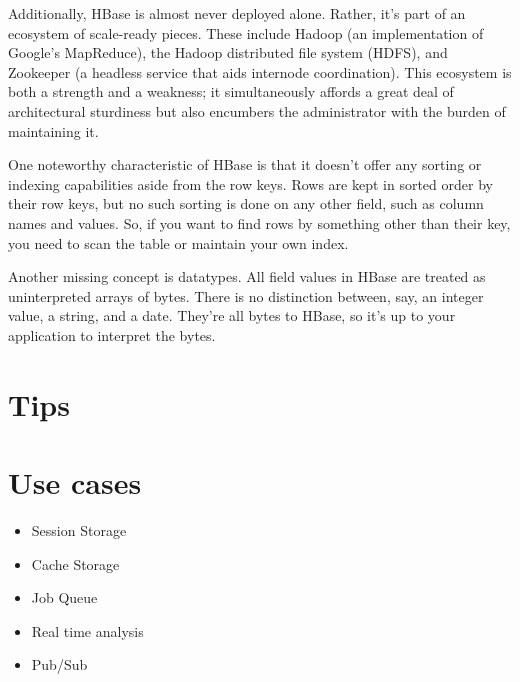 Additionally, HBase is almost never deployed alone. Rather, it's part of an ecosystem of scale-ready pieces. These include Hadoop (an implementation of Google's MapReduce), the Hadoop distributed file system (HDFS), and Zookeeper (a headless service that aids internode coordination). This ecosystem is both a strength and a weakness; it simultaneously affords a great deal of architectural sturdiness but also encumbers the administrator with the burden of maintaining it.

One noteworthy characteristic of HBase is that it doesn't offer any sorting or indexing capabilities aside from the row keys. Rows are kept in sorted order by their row keys, but no such sorting is done on any other field, such as column names and values. So, if you want to find rows by something other than their key, you need to scan the table or maintain your own index.

Another missing concept is datatypes. All field values in HBase are treated as uninterpreted arrays of bytes. There is no distinction between, say, an integer value, a string, and a date. They're all bytes to HBase, so it's up to your application to interpret the bytes.\cite{seven_databases}

\section{Tips}

\section{Use cases}

\begin{itemize}
  \item Session Storage
  \item Cache Storage
  \item Job Queue
  \item Real time analysis
  \item Pub/Sub
\end{itemize}